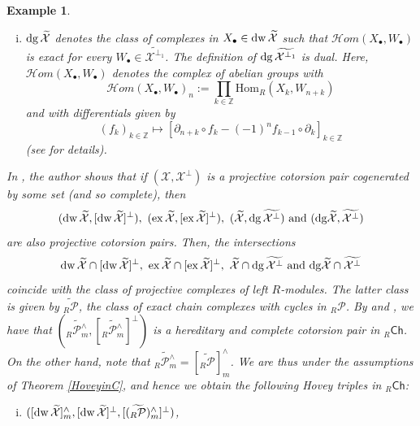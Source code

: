 \documentclass[10pt,reqno]{amsart}
\numberwithin{equation}{section}
\newtheorem{example}[definition]{Example}
\theoremstyle{remark}
\newcommand{\Hom}{\mathrm{Hom}}
\newcommand{\X}{\mathcal{X}}
\begin{document}
\begin{example}
\begin{enumerate}[(i)]
\item ${\rm dg}\,\widetilde{\X}$ denotes the class of complexes in $X_\bullet \in {\rm dw}\,\widetilde{\X}$ such that $\mathcal{H}om(X_{\bullet}, W_\bullet)$ is exact for every $W_\bullet \in \widetilde{\mathcal{X}^{\perp_1}}$. The definition of ${\rm dg}\,\widetilde{\X^{\perp_1}}$ is dual. Here, $\mathcal{H}om(X_{\bullet}, W_\bullet)$ denotes the complex of abelian groups with
\[
\mathcal{H}om(X_{\bullet}, W_\bullet)_n := \prod_{k \in \mathbb{Z}} \Hom_R(X_k,W_{n+k})
\]
and with differentials given by
\[
(f_k)_{k \in \mathbb{Z}} \mapsto [\partial_{n+k} \circ f_k - (-1)^n f_{k-1} \circ \partial_k]_{k \in \mathbb{Z}}
\] 
(see \cite[\S 2.1]{GRcomplexes} for details). 
\end{enumerate}
In \cite[Prop. 7.3]{GillespieAdvances}, the author shows that if $(\mathcal{X},\mathcal{X}^\perp)$ is a projective cotorsion pair cogenerated by some set (and so complete), then
\[
({\rm dw}\,\widetilde{\mathcal{X}}, [{\rm dw}\,\widetilde{\mathcal{X}}]^\perp), \, \, ({\rm ex}\,\widetilde{\mathcal{X}}, [{\rm ex}\,\widetilde{\mathcal{X}}]^\perp), \, \, (\widetilde{\mathcal{X}}, {\rm dg}\,\widetilde{\mathcal{X}^\perp}) \, \, \text{and} \, \, ({\rm dg}\widetilde{\mathcal{X}}, \widetilde{\mathcal{X}^\perp})
\] 
are also projective cotorsion pairs. Then, the intersections
\[
{\rm dw}\,\widetilde{\mathcal{X}} \cap [{\rm dw}\,\widetilde{\mathcal{X}}]^\perp, \, \, {\rm ex}\,\widetilde{\mathcal{X}} \cap [{\rm ex}\,\widetilde{\mathcal{X}}]^\perp, \, \, \widetilde{\mathcal{X}} \cap {\rm dg}\,\widetilde{\mathcal{X}^\perp} \, \, \text{and} \, \, {\rm dg}\widetilde{\mathcal{X}} \cap \widetilde{\mathcal{X}^\perp}
\]
coincide with the class of projective complexes of left $R$-modules. The latter class is given by $\widetilde{{}_R\mathcal{P}}$, the class of exact chain complexes with cycles in ${}_R\mathcal{P}$. By \cite[Thm. 7.4.6]{EnJen00} and \cite[Thm. 7.3.2]{EnJen00-2}, we have that $(\widetilde{{}_R\mathcal{P}^\wedge_m}, [\widetilde{{}_R\mathcal{P}^\wedge_m}]^\perp)$ is a hereditary and complete cotorsion pair in ${}_R\mathsf{Ch}$. On the other hand, note that $\widetilde{{}_R\mathcal{P}^\wedge_m} = [\widetilde{{}_R\mathcal{P}}]^\wedge_m$. We are thus under the assumptions of Theorem \ref{HoveyinC}, and hence we obtain the following Hovey triples in ${}_R\mathsf{Ch}$:
\begin{enumerate}[(i)]
\item $([{\rm dw}\,\widetilde{\mathcal{X}}]^\wedge_m, [{\rm dw}\,\widetilde{\mathcal{X}}]^\perp, [(\widetilde{{}_R\mathcal{P}})^\wedge_m]^\perp)$,


\end{enumerate}
\end{example}
\end{document}
